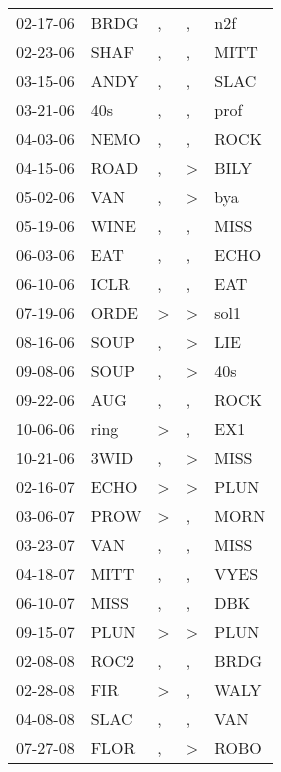 \begin{supertabular}{lllll}
 02-17-06 &  BRDG &             , &             , &   n2f \\
 02-23-06 &  SHAF &             , &             , &  MITT \\
 03-15-06 &  ANDY &             , &             , &  SLAC \\
 03-21-06 &   40s &             , &             , &  prof \\
 04-03-06 &  NEMO &             , &             , &  ROCK \\
 04-15-06 &  ROAD &             , &  \textgreater &  BILY \\
 05-02-06 &   VAN &             , &  \textgreater &   bya \\
 05-19-06 &  WINE &             , &             , &  MISS \\
 06-03-06 &   EAT &             , &             , &  ECHO \\
 06-10-06 &  ICLR &             , &             , &   EAT \\
 07-19-06 &  ORDE &  \textgreater &  \textgreater &  sol1 \\
 08-16-06 &  SOUP &             , &  \textgreater &   LIE \\
 09-08-06 &  SOUP &             , &  \textgreater &   40s \\
 09-22-06 &   AUG &             , &             , &  ROCK \\
 10-06-06 &  ring &  \textgreater &             , &   EX1 \\
 10-21-06 &  3WID &             , &  \textgreater &  MISS \\
 02-16-07 &  ECHO &  \textgreater &  \textgreater &  PLUN \\
 03-06-07 &  PROW &  \textgreater &             , &  MORN \\
 03-23-07 &   VAN &             , &             , &  MISS \\
 04-18-07 &  MITT &             , &             , &  VYES \\
 06-10-07 &  MISS &             , &             , &   DBK \\
 09-15-07 &  PLUN &  \textgreater &  \textgreater &  PLUN \\
 02-08-08 &  ROC2 &             , &             , &  BRDG \\
 02-28-08 &   FIR &  \textgreater &             , &  WALY \\
 04-08-08 &  SLAC &             , &             , &   VAN \\
 07-27-08 &  FLOR &             , &  \textgreater &  ROBO \\

\end{supertabular}
